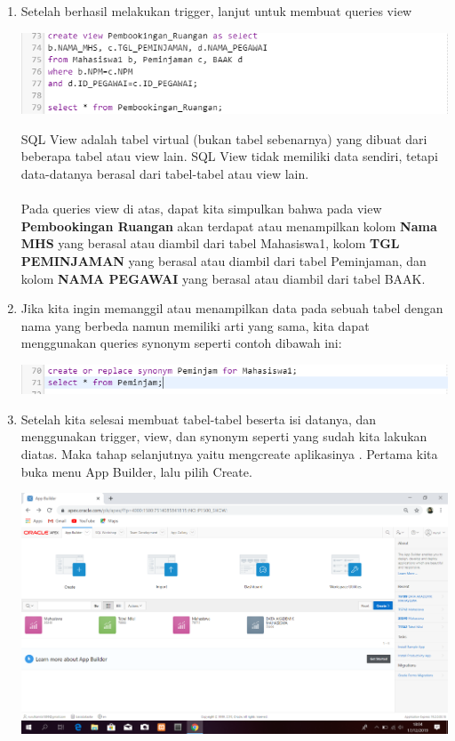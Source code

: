 \documentclass{article}
\begin{document}
\begin{enumerate}
     \item  Setelah berhasil melakukan trigger, lanjut untuk membuat queries view
     \begin{center}
     \includegraphics[width=.8\textwidth]{Figure/q10.PNG}
     \end{center}
     SQL View adalah tabel virtual (bukan tabel sebenarnya) yang dibuat dari beberapa tabel atau view lain. SQL View tidak memiliki data sendiri, tetapi data-datanya berasal dari tabel-tabel atau view lain.\\
     \\
     Pada queries view di atas, dapat kita simpulkan bahwa pada view \textbf{Pembookingan Ruangan} akan terdapat atau menampilkan kolom \textbf{Nama MHS} yang berasal atau diambil dari tabel Mahasiswa1, kolom \textbf{TGL PEMINJAMAN} yang berasal atau diambil dari tabel Peminjaman, dan kolom \textbf{NAMA PEGAWAI} yang berasal atau diambil dari tabel BAAK.
     
     \item  Jika kita ingin memanggil atau menampilkan data pada sebuah tabel dengan nama yang berbeda namun memiliki arti yang sama, kita dapat menggunakan queries synonym seperti contoh dibawah ini:
     \begin{center}
     \includegraphics[width=.8\textwidth]{Figure/q11.PNG}
     \end{center}
     
     \item  Setelah kita selesai membuat tabel-tabel beserta isi datanya, dan menggunakan trigger, view, dan synonym seperti yang sudah kita lakukan diatas. Maka tahap selanjutnya yaitu mengcreate aplikasinya . Pertama kita buka menu App Builder, lalu pilih Create.
     \begin{center}
     \includegraphics[width=.8\textwidth]{Figure/1.PNG}
     \end{center}
     

\end{enumerate}
\end{document}
